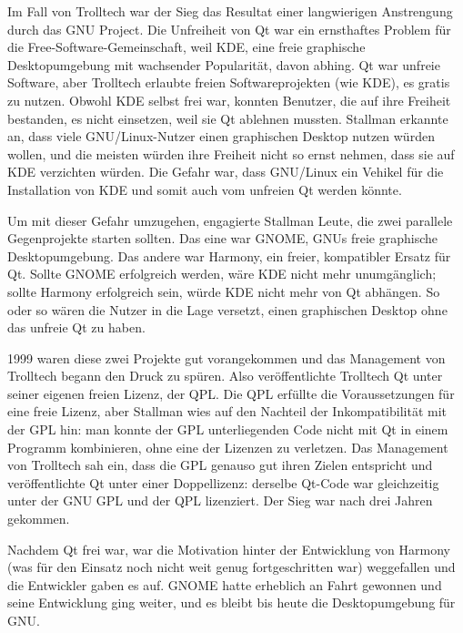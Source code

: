 Im Fall von Trolltech war der Sieg das Resultat einer langwierigen Anstrengung durch das GNU Project. Die Unfreiheit von Qt war ein ernsthaftes Problem für die Free-Software-Gemeinschaft, weil KDE, eine freie graphische Desktopumgebung mit wachsender Popularität, davon abhing. Qt war unfreie Software, aber Trolltech erlaubte freien Softwareprojekten (wie KDE), es gratis zu nutzen. Obwohl KDE selbst frei war, konnten Benutzer, die auf ihre Freiheit bestanden, es nicht einsetzen, weil sie Qt ablehnen mussten. Stallman erkannte an, dass viele GNU/Linux-Nutzer einen graphischen Desktop nutzen würden wollen, und die meisten würden ihre Freiheit nicht so ernst nehmen, dass sie auf KDE verzichten würden. Die Gefahr war, dass GNU/Linux ein Vehikel für die Installation von KDE und somit auch vom unfreien Qt werden könnte. 

Um mit dieser Gefahr umzugehen, engagierte Stallman Leute, die zwei parallele Gegenprojekte starten sollten. Das eine war GNOME, GNUs freie graphische Desktopumgebung. Das andere war Harmony, ein freier, kompatibler Ersatz für Qt. Sollte GNOME erfolgreich werden, wäre KDE nicht mehr unumgänglich; sollte Harmony erfolgreich sein, würde KDE nicht mehr von Qt abhängen. So oder so wären die Nutzer in die Lage versetzt, einen graphischen Desktop ohne das unfreie Qt zu haben.

1999 waren diese zwei Projekte gut vorangekommen und das Management von Trolltech begann den Druck zu spüren. Also veröffentlichte Trolltech Qt unter seiner eigenen freien Lizenz, der QPL. Die QPL erfüllte die Voraussetzungen für eine freie Lizenz, aber Stallman wies auf den Nachteil der Inkompatibilität mit der GPL hin: man konnte der GPL unterliegenden Code nicht mit Qt in einem Programm kombinieren, ohne eine der Lizenzen zu verletzen. Das Management von Trolltech sah ein, dass die GPL genauso gut ihren Zielen entspricht und veröffentlichte Qt unter einer Doppellizenz: derselbe Qt-Code war gleichzeitig unter der GNU GPL und der QPL lizenziert. Der Sieg war nach drei Jahren gekommen.

Nachdem Qt frei war, war die Motivation hinter der Entwicklung von Harmony (was für den Einsatz noch nicht weit genug fortgeschritten war) weggefallen und die Entwickler gaben es auf. GNOME hatte erheblich an Fahrt gewonnen und seine Entwicklung ging weiter, und es bleibt bis heute die Desktopumgebung für GNU.

